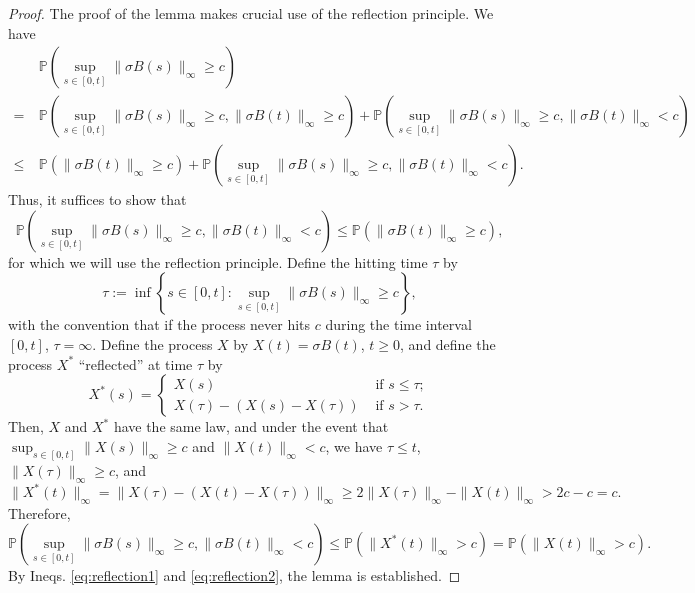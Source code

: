 \documentclass[10pt,a4paper]{amsart}
\newcommand{\pr}{\mathbb{P}}
\begin{document}
\begin{proof}
The proof of the lemma makes crucial use of the reflection principle. We have 
\begin{align}
&~\pr\left(\sup_{s\in [0,t]} \|\sigma B(s)\|_\infty \geq c \right) \nonumber\\
=&~\pr\left(\sup_{s\in [0,t]} \|\sigma B(s)\|_\infty \geq c, \|\sigma B(t)\|_\infty \geq c \right) 
+ \pr\left(\sup_{s\in [0,t]} \|\sigma B(s)\|_\infty \geq c, \|\sigma B(t)\|_\infty < c \right) \nonumber \\
\leq &~\pr\left(\|\sigma B(t)\|_\infty \geq c \right) + \pr\left(\sup_{s\in [0,t]} \|\sigma B(s)\|_\infty \geq c, \|\sigma B(t)\|_\infty < c \right). 
\label{eq:reflection1}
\end{align}
Thus, it suffices to show that 
\[
\pr\left(\sup_{s\in [0,t]} \|\sigma B(s)\|_\infty \geq c, \|\sigma B(t)\|_\infty < c \right) \leq \pr\left(\|\sigma B(t)\|_\infty \geq c \right), 
\]
for which we will use the reflection principle. Define the hitting time $\tau$ by 
\[
\tau := \inf \left\{s \in [0, t] : \sup_{s\in [0,t]} \|\sigma B(s)\|_\infty \geq c\right\}, 
\]
with the convention that if the process never hits $c$ during the time interval $[0, t]$, $\tau = \infty$. 
Define the process $X$ by $X(t) = \sigma B(t)$, $t \geq 0$, and define the process $X^*$ ``reflected'' at time $\tau$ by
\[
X^*(s) = \left\{\begin{array}{ll}
X(s) & \text{ if } s\leq \tau; \\
X(\tau) - (X(s)-X(\tau)) & \text{ if } s > \tau.
\end{array}\right.
\]
Then, $X$ and $X^*$ have the same law, and under the event that $\sup_{s\in [0,t]} \|X(s)\|_\infty \geq c$ and $\|X(t)\|_\infty < c$, 
we have $\tau \leq t$, $\|X(\tau)\|_\infty \geq c$, and 
\[
\|X^*(t)\|_\infty = \|X(\tau) - (X(t)-X(\tau))\|_\infty \geq 2\|X(\tau)\|_\infty - \|X(t)\|_\infty > 2c-c = c.
\]
Therefore, 
\begin{equation}\label{eq:reflection2}
\pr\left(\sup_{s\in [0,t]} \|\sigma B(s)\|_\infty \geq c, \|\sigma B(t)\|_\infty < c \right) 
\leq \pr\left(\|X^*(t)\|_\infty > c \right) = \pr\left(\|X(t)\|_\infty > c \right).
\end{equation}
By Ineqs. \eqref{eq:reflection1} and \eqref{eq:reflection2}, the lemma is established.
\end{proof}
\end{document}
